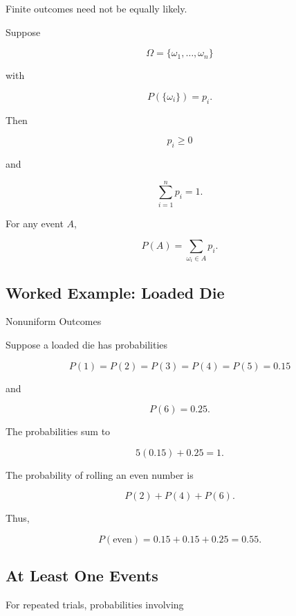 Finite outcomes need not be equally likely.

Suppose

\[
\Omega
=
\{\omega_1,\ldots,\omega_n\}
\]

with

\[
P(\{\omega_i\})=p_i.
\]

Then

\[
\boxed{
p_i\geq0
}
\]

and

\[
\boxed{
\sum_{i=1}^{n}p_i=1.
}
\]

For any event \(A\),

\[
\boxed{
P(A)
=
\sum_{\omega_i\in A}p_i.
}
\]

\subsection{Worked Example: Loaded Die}
\label{subsec:worked-loaded-die}

\begin{workedexamplebox}{Nonuniform Outcomes}

Suppose a loaded die has probabilities

\[
P(1)=P(2)=P(3)=P(4)=P(5)=0.15
\]

and

\[
P(6)=0.25.
\]

The probabilities sum to

\[
5(0.15)+0.25=1.
\]

The probability of rolling an even number is

\[
P(2)+P(4)+P(6).
\]

Thus,

\begin{answerbox}
\[
\boxed{
P(\text{even})
=
0.15+0.15+0.25
=
0.55.
}
\]
\end{answerbox}

\end{workedexamplebox}

\subsection{At Least One Events}
\label{subsec:at-least-one-events}

For repeated trials, probabilities involving

